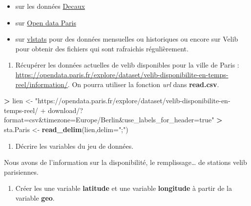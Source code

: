 \documentclass[]{article}
\newenvironment{Shaded}{\begin{snugshade}}{\end{snugshade}}
\newcommand{\DataTypeTok}[1]{\textcolor[rgb]{0.13,0.29,0.53}{#1}}
\newcommand{\KeywordTok}[1]{\textcolor[rgb]{0.13,0.29,0.53}{\textbf{#1}}}
\newcommand{\NormalTok}[1]{#1}
\newcommand{\OperatorTok}[1]{\textcolor[rgb]{0.81,0.36,0.00}{\textbf{#1}}}
\newcommand{\StringTok}[1]{\textcolor[rgb]{0.31,0.60,0.02}{#1}}
\providecommand{\tightlist}{%
  \setlength{\itemsep}{0pt}\setlength{\parskip}{0pt}}
\theoremstyle{definition}
\theoremstyle{definition}
\theoremstyle{definition}
\theoremstyle{remark}
\begin{document}
\begin{itemize}
\tightlist
\item
  sur les données \href{https://developer.jcdecaux.com/\#/opendata/vls?page=getstarted}{Decaux}
\item
  sur \href{https://opendata.paris.fr/pages/home/}{Open data Paris}
\item
  sur \href{http://vlsstats.ifsttar.fr/rawdata}{vlstats} pour des données mensuelles ou historiques ou encore sur Velib pour obtenir des fichiers qui sont rafraichis
  régulièrement.
\end{itemize}

\begin{enumerate}
\def\labelenumi{\arabic{enumi}.}
\tightlist
\item
  Récupérer les données actuelles de velib disponibles pour la ville de Paris : \url{https://opendata.paris.fr/explore/dataset/velib-disponibilite-en-temps-reel/information/}. On pourra utiliser la fonction \emph{url} dans \textbf{read.csv}.
\end{enumerate}

\begin{Shaded}
\begin{Highlighting}[]
\OperatorTok{>}\StringTok{ }\NormalTok{lien <-}\StringTok{ "https://opendata.paris.fr/explore/dataset/velib-disponibilite-en-temps-reel/}
\StringTok{+ download/?format=csv&timezone=Europe/Berlin&use_labels_for_header=true"}
\OperatorTok{>}\StringTok{ }\NormalTok{sta.Paris <-}\StringTok{ }\KeywordTok{read_delim}\NormalTok{(lien,}\DataTypeTok{delim=}\StringTok{";"}\NormalTok{)}
\end{Highlighting}
\end{Shaded}

\begin{enumerate}
\def\labelenumi{\arabic{enumi}.}
\setcounter{enumi}{1}
\tightlist
\item
  Décrire les variables du jeu de données.
\end{enumerate}

Nous avons de l'information sur la disponibilité, le remplissage\ldots{} de stations velib parisiennes.

\begin{enumerate}
\def\labelenumi{\arabic{enumi}.}
\setcounter{enumi}{2}
\tightlist
\item
  Créer les une variable \textbf{latitude} et une variable \textbf{longitude} à partir de la variable \textbf{geo}.
\end{enumerate}
\end{document}
